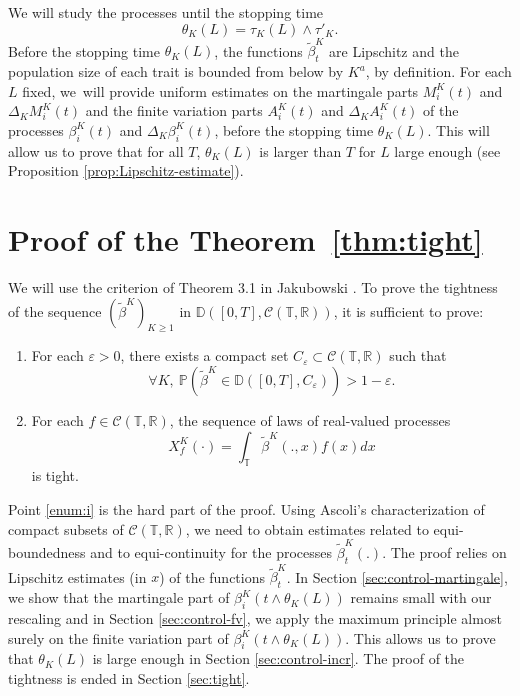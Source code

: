 \documentclass[10pt]{amsart}
\newenvironment{enumeratei}
{\bgroup\def\theenumi{\roman{enumi}}\def\theenumii{\arabic{enumii}}\begin{enumerate}}
{\end{enumerate}\egroup}
\theoremstyle{plain}
\theoremstyle{remark}
\newcommand{\Co}{\mathcal{C}}
\newcommand\T{\mathbb{T}}
\begin{document}
We will study the processes until the stopping time
\begin{equation}
\theta_K(L)=\tau_K(L)\wedge \tau'_{K}.\label{def:thetaK(L)}
\end{equation}
Before the stopping time $\theta_K(L)$, the functions $\widetilde{\beta}^K_t$ are Lipschitz and the population size of each trait is bounded from below by $K^a$, by definition. For each $L$ fixed, we~will provide uniform estimates on the martingale parts $M^K_{i}(t)$ and $\Delta_K M^K_{i}(t)$ and the finite variation parts $A^K_{i}(t)$ and $\Delta_K A^K_{i}(t)$ of the processes $\beta^K_{i}(t)$ and $\Delta_K\beta^K_{i}(t)$, before the stopping time $\theta_K(L)$. This will allow us to prove that for all $T$, $\theta_K(L)$ is larger than $T$ for $L$ large enough (see Proposition \ref{prop:Lipschitz-estimate}).

\section{Proof of the Theorem~\ref{thm:tight}}
\label{sec:main-steps}

We will use the criterion of Theorem 3.1 in Jakubowski \cite{jakubowski}. To prove the tightness of the sequence $(\widetilde{\beta}^K)_{K\geq 1}$ in $\mathbb{D}([0,T],\Co(\T,\mathbb{R}))$, it is sufficient to prove:

\begin{enumeratei}
\item\label{enum:i}
For each $\varepsilon>0$, there exists a compact set $C_{\varepsilon}\subset \Co(\T,\mathbb{R})$ such that
\[\forall K,\ \mathbb{P}\left(\widetilde \beta^K\in \mathbb{D}([0,T], C_{\varepsilon})\right) >1-\varepsilon.\]
\item\label{enum:ii}
For each $f\in \Co(\T,\mathbb{R})$, the sequence of laws of real-valued processes
\begin{equation}\label{def-Xf}X^K_{f}(\cdot) = \int_\T \widetilde \beta^K(.,x) f(x) dx\end{equation}
is tight.
\end{enumeratei}

Point \eqref{enum:i} is the hard part of the proof. Using Ascoli's characterization of compact subsets of $\Co(\T,\mathbb{R})$, we need to obtain estimates related to equi-boundedness and to equi-continuity for the processes $\widetilde \beta^K_{t}(.)$.
The proof relies on Lipschitz estimates (in $x$) of the functions $\widetilde{\beta}^K_t$. In Section \ref{sec:control-martingale}, we show that the martingale part of $\beta^K_i(t\wedge\theta_K(L))$ remains small with our rescaling and in Section \ref{sec:control-fv}, we apply the maximum principle almost surely on the finite variation part of $\beta^K_i(t\wedge\theta_K(L))$. This allows us to prove that $\theta_K(L)$ is large enough in Section \ref{sec:control-incr}. The proof of the tightness is ended in Section \ref{sec:tight}.
\end{document}

